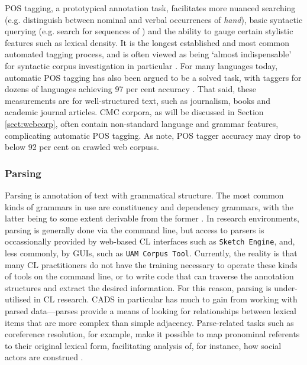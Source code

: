 \gls{POS} tagging, a prototypical annotation task, facilitates more nuanced searching (e.g. distinguish between nominal and verbal occurrences of \emph{hand}), basic syntactic querying (e.g. search for sequences of ) and the ability to gauge certain stylistic features such as lexical density. It is the longest established and most common automated tagging process, and is often viewed as being `almost indispensable' for syntactic \gls{corpus} investigation in particular \cite[p.~23]{giesbrecht_is_2009}. For many languages today, automatic \gls{POS} tagging has also been argued to be a solved task, with taggers for dozens of languages achieving 97 per cent accuracy \cite{giesbrecht_is_2009}. That said, these measurements are for well\hyp{}structured text, such as journalism, books and academic journal articles. \gls{CMC} corpora, as will be discussed in Section \ref{sect:webcorp}, often contain non-standard language and grammar features, complicating automatic \gls{POS} tagging. As \textcite{giesbrecht_is_2009} note, \gls{POS} tagger accuracy may drop to below 92 per cent on crawled web \glspl{corpus}.

\subsubsection{Parsing}

Parsing is annotation of text with grammatical structure. The most common kinds of grammars in use are constituency and dependency grammars, with the latter being to some extent derivable from the former \cite{de2006generating}. In research environments, parsing is generally done via the command line, but access to parsers is occassionally provided by web\hyp{}based \gls{CL} interfaces such as \texttt{Sketch Engine}, and, less commonly, by \Glspl{GUI}, such as \texttt{UAM Corpus Tool}. Currently, the reality is that many \gls{CL} practitioners do not have the training necessary to operate these kinds of tools on the command line, or to write code that can traverse the annotation structures and extract the desired information. For this reason, parsing is under\hyp{}utilised in \gls{CL} research. \gls{CADS} in particular has much to gain from working with parsed data---parses provide a means of looking for relationships between lexical items that are more complex than simple adjacency. Parse\hyp{}related tasks such as coreference resolution, for example, make it possible to map pronominal referents to their original lexical form, facilitating analysis of, for instance, how social actors are construed \cite{feng_rst-style_2015}.

